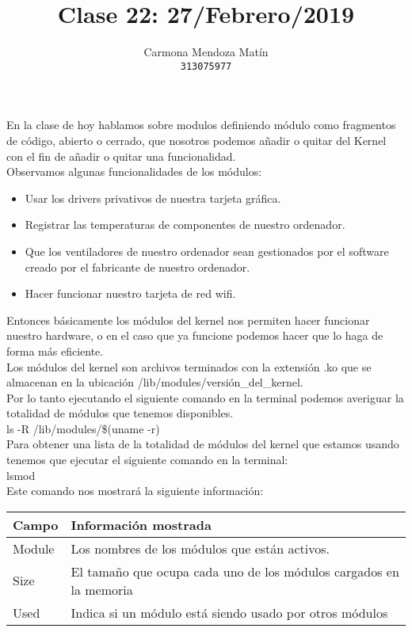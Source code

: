 \documentclass[11pt, a4paper]{report}
\begin{document}
\title{Clase 22: 27/Febrero/2019}
\author{
  Carmona Mendoza Mat\'in\\
  \texttt{313075977}
}
\date{}
\maketitle

En la clase de hoy hablamos sobre modulos definiendo módulo como
fragmentos de código, abierto o cerrado, que nosotros podemos añadir o
quitar del Kernel con el fin de añadir o quitar una funcionalidad. \\

Observamos algunas funcionalidades de los módulos:

\begin{itemize}
\item Usar los drivers privativos de nuestra tarjeta gráfica.
\item Registrar las temperaturas de componentes de nuestro ordenador.
\item Que los ventiladores de nuestro ordenador sean gestionados por el
  software creado por el fabricante de nuestro ordenador.
\item Hacer funcionar nuestro tarjeta de red wifi.
\end{itemize}

Entonces básicamente los módulos del kernel nos permiten hacer funcionar
nuestro hardware, o en el caso que ya funcione podemos hacer que lo haga
de forma más eficiente. \\

Los módulos del kernel son archivos terminados con la extensión .ko que
se almacenan en la ubicación /lib/modules/versión\_del\_kernel. \\

Por lo tanto ejecutando el siguiente comando en la terminal podemos
averiguar la totalidad de módulos que tenemos disponibles. \\

ls -R /lib/modules/\$(uname -r) \\

Para obtener una lista de la totalidad de módulos del kernel que estamos
usando tenemos que ejecutar el siguiente comando en la terminal: \\

lsmod \\

Este comando nos mostrará la siguiente información:

\begin{table}[htbp]
\begin{center}
\begin{tabular}{|l|l|}
\hline
Campo & Información mostrada \\
\hline \hline
Module & Los nombres de los módulos que están activos. \\ \hline
Size & El tamaño que ocupa cada uno de los módulos cargados en la
memoria
\\ \hline
Used & Indica si un módulo está siendo usado por otros módulos \\ \hline
\end{tabular}
\end{center}
\end{table} 
\end{document}

